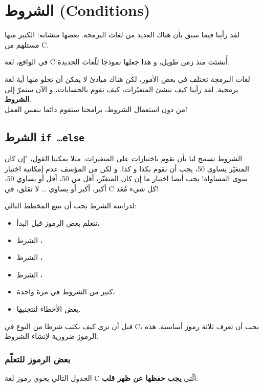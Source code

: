 \chapter{الشروط (\textenglish{Conditions})}

لقد رأينا فيما سبق بأن هناك العديد من لغات البرمجة. بعضها متشابه: الكثير منها مستلهم من \textenglish{C}.

في الواقع، لغة  \textenglish{C}
أُنشئت منذ زمن طويل، و هذا جعلها نموذجا للّغات الجديدة.

لغات البرمجة تختلف في بعض الأمور، لكن هناك مبادئ لا يمكن أن تخلو منها أية لغة برمجية. لقد رأينا كيف ننشئ المتغيّرات، كيف نقوم بالحسابات، و الآن سنمرّ إلى 
\textbf{الشروط}.\\
من دون استعمال الشروط، برامجنا ستقوم دائما بنفس العمل!

\section{الشرط \texttt{if \dots else}}

الشروط تسمح لنا بأن نقوم باختبارات على المتغيرات. مثلا يمكننا القول، "إن كان المتغيّر 
يساوي 50، يجب أن نقوم بكذا و كذا. و لكن من المؤسف عدم إمكانية اختبار سوى المساواة! يجب أيضا اختبار ما إن كان المتغيّر، أقل من 50، أقل أو يساوي 50، أكبر، أكبر أو يساوي
\dots
لا تقلق، في \textenglish{C}
كل شيء مُعَد!

لدراسة الشرط 
يجب أن نتبع المخطط التالي:

\begin{itemize}
\item نتعلم بعض الرموز قبل البدأ،
\item الشرط 
،
\item الشرط 
،
\item الشرط
،
\item كثير من الشروط في مرة واحدة،
\item بعض الأخطاء لنتجنبها.
\end{itemize}

قبل أن نرى كيف نكتب شرطا من النوع
في \textenglish{C}، يجب أن تعرف ثلاثة رموز أساسية. هذه الرموز ضرورية لإنشاء الشروط.

\subsection{بعض الرموز للتعلّم}

الجدول التالي يحوي رموز لغة \textenglish{C} الّتي
\textbf{يجب حفظها عن ظهر قلب}:

